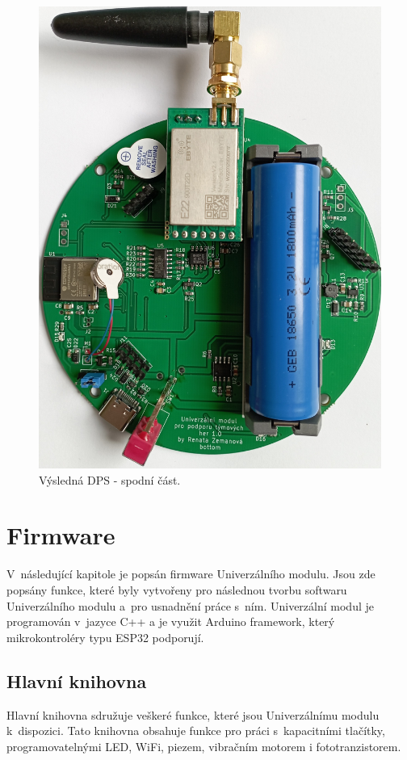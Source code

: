 \begin{figure}[!h]
  \begin{center}
    \includegraphics[scale=0.15]{obrazky/DPS_final_spodni.jpg}
  \end{center}
  \caption[Výsledná DPS - spodní část]{Výsledná DPS - spodní část.}
\end{figure}

\chapter{Firmware}
V~následující kapitole je popsán firmware Univerzálního modulu. Jsou zde popsány funkce, které byly vytvořeny pro následnou tvorbu softwaru Univerzálního modulu a~pro usnadnění práce s~ním. Univerzální 
modul je programován v~jazyce C++ a je využit Arduino framework, který mikrokontroléry typu ESP32 podporují.  

\section{Hlavní knihovna}
Hlavní knihovna sdružuje veškeré funkce, které jsou Univerzálnímu modulu k~dispozici. Tato knihovna obsahuje funkce pro práci s~kapacitními tlačítky, programovatelnými LED, WiFi, piezem, vibračním 
motorem i fototranzistorem. 


